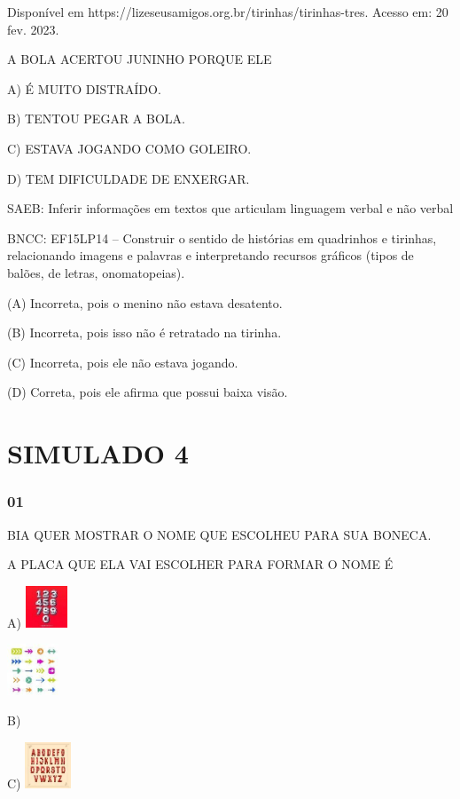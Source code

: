Disponível em https://lizeseusamigos.org.br/tirinhas/tirinhas-tres.
Acesso em: 20 fev. 2023.

A BOLA ACERTOU JUNINHO PORQUE ELE

A) É MUITO DISTRAÍDO.

B) TENTOU PEGAR A BOLA.

C) ESTAVA JOGANDO COMO GOLEIRO.

D) TEM DIFICULDADE DE ENXERGAR.

SAEB: Inferir informações em textos que articulam linguagem
verbal e não verbal

BNCC: EF15LP14 -- Construir o sentido de histórias em
quadrinhos e tirinhas, relacionando imagens e palavras e interpretando
recursos gráficos (tipos de balões, de letras, onomatopeias).

(A) Incorreta, pois o menino não estava desatento.

(B) Incorreta, pois isso não é retratado na tirinha.

(C) Incorreta, pois ele não estava jogando.

(D) Correta, pois ele afirma que possui baixa visão.

\section{SIMULADO 4}\label{simulado-4}

\subsubsection{01}\label{section-73}

BIA QUER MOSTRAR O NOME QUE ESCOLHEU PARA SUA BONECA.

A PLACA QUE ELA VAI ESCOLHER PARA FORMAR O NOME É

A)
\includegraphics[width=0.48889in,height=0.48889in]{media/image239.jpg}

\includegraphics[width=0.60625in,height=0.60625in]{media/image240.jpg}

B)

C)
\includegraphics[width=0.54236in,height=0.54236in]{media/image241.jpg}

